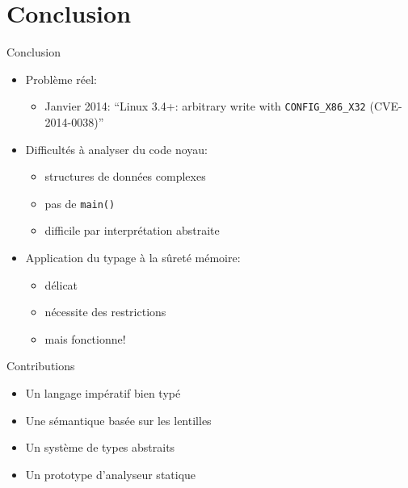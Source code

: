 \section{Conclusion}

\begin{frame}{Conclusion}
    \begin{itemize}
    \item Problème réel:
        \begin{itemize}
            \item Janvier 2014:
                \enquote{Linux 3.4+: arbitrary write with \texttt{CONFIG\_X86\_X32} (CVE-2014-0038)}
        \end{itemize}
    \item Difficultés à analyser du code noyau:
        \begin{itemize}
            \item structures de données complexes
            \item pas de \texttt{main()}
            \item difficile par interprétation abstraite
        \end{itemize}
    \item Application du typage à la sûreté mémoire:
        \begin{itemize}
            \item délicat
            \item nécessite des restrictions
            \item mais fonctionne!
        \end{itemize}
    \end{itemize}
\end{frame}

\begin{frame}{Contributions}
\begin{itemize}
\item Un langage impératif bien typé
\item Une sémantique basée sur les lentilles
\item Un système de types abstraits
\item Un prototype d'analyseur statique
\end{itemize}
\end{frame}

